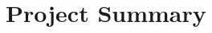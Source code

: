 \documentclass{proposalnsf}
\begin{document}
\section*{Project Summary}
\renewcommand{\thepage} {A--\arabic{page}}






\end{document}
